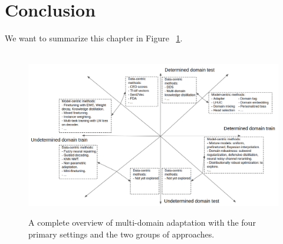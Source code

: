\section{Conclusion}
We want to summarize this chapter in Figure ~\ref{fig:review_mdmt}.
\begin{figure}[htbp]
  \hbox{\hspace{-3.5em}  \includegraphics[width=1.2\textwidth]{graphics/review_mdmt}}
  \caption{A complete overview of multi-domain adaptation with the four primary settings and the two groups of approaches.}
\label{fig:review_mdmt}
\end{figure}

